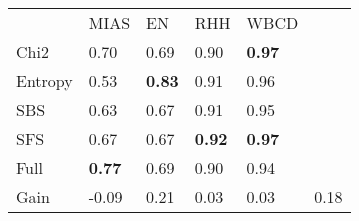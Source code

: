 \begin{tabular}{|l|l|l|l|l|l}
\cline{1-5}
        & MIAS              & EN                & RHH               & WBCD      &         \\
\cline{1-5}
Chi2    & 0.70           & 0.69           & 0.90           & \textbf{0.97}  &         \\
Entropy & 0.53           & \textbf{0.83}  & 0.91           & 0.96           &         \\
SBS     & 0.63           & 0.67           & 0.91           & 0.95           &         \\
SFS     & 0.67           & 0.67           & \textbf{0.92}  & \textbf{0.97}  &         \\
Full    & \textbf{0.77}  & 0.69           & 0.90           & 0.94           &         \\
\cline{1-5}
\cline{1-5}
Gain    & -0.09           & 0.21           & 0.03           & 0.03           & 0.18 \\
\cline{1-5}
\end{tabular}
